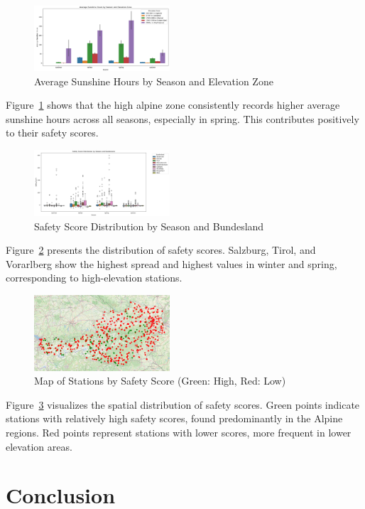 \documentclass[sigconf]{acmart}
\begin{document}
\begin{figure}[H]
    \centering
    \includegraphics[width=0.45\textwidth]{img/sunshine_by_season_zone.png}
    \caption{Average Sunshine Hours by Season and Elevation Zone}
    \label{fig:sunshine}
\end{figure}

Figure~\ref{fig:sunshine} shows that the high alpine zone consistently records higher average sunshine hours across all seasons, especially in spring. This contributes positively to their safety scores.

\begin{figure}[H]
    \centering
    \includegraphics[width=0.45\textwidth]{img/safety_score_boxplot.png}
    \caption{Safety Score Distribution by Season and Bundesland}
    \label{fig:safety_boxplot}
\end{figure}

Figure~\ref{fig:safety_boxplot} presents the distribution of safety scores. Salzburg, Tirol, and Vorarlberg show the highest spread and highest values in winter and spring, corresponding to high-elevation stations.

\begin{figure}[H]
    \centering
    \includegraphics[width=0.45\textwidth]{img/station_map.png}
    \caption{Map of Stations by Safety Score (Green: High, Red: Low)}
    \label{fig:station_map}
\end{figure}

Figure~\ref{fig:station_map} visualizes the spatial distribution of safety scores. Green points indicate stations with relatively high safety scores, found predominantly in the Alpine regions. Red points represent stations with lower scores, more frequent in lower elevation areas.

\section{Conclusion}



\end{document}
